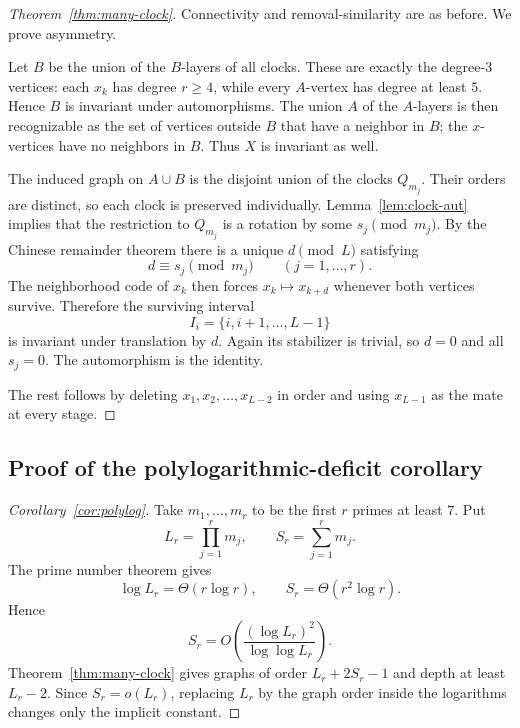 \documentclass[11pt]{article}
\theoremstyle{definition}
\theoremstyle{remark}
\begin{document}
\begin{proof}[Theorem~\ref{thm:many-clock}]
Connectivity and removal-similarity are as before. We prove asymmetry.

Let $B$ be the union of the $B$-layers of all clocks. These are exactly the degree-$3$ vertices: each $x_k$ has degree $r\ge4$, while every $A$-vertex has degree at least $5$. Hence $B$ is invariant under automorphisms. The union $A$ of the $A$-layers is then recognizable as the set of vertices outside $B$ that have a neighbor in $B$; the $x$-vertices have no neighbors in $B$. Thus $X$ is invariant as well.

The induced graph on $A\cup B$ is the disjoint union of the clocks $Q_{m_j}$. Their orders are distinct, so each clock is preserved individually. Lemma~\ref{lem:clock-aut} implies that the restriction to $Q_{m_j}$ is a rotation by some $s_j\pmod{m_j}$. By the Chinese remainder theorem there is a unique $d\pmod L$ satisfying
\[
    d\equiv s_j\pmod{m_j}
    \qquad (j=1,\ldots,r).
\]
The neighborhood code of $x_k$ then forces $x_k\mapsto x_{k+d}$ whenever both vertices survive. Therefore the surviving interval
\[
    I_i=\{i,i+1,\ldots,L-1\}
\]
is invariant under translation by $d$. Again its stabilizer is trivial, so $d=0$ and all $s_j=0$. The automorphism is the identity.

The rest follows by deleting $x_1,x_2,\ldots,x_{L-2}$ in order and using $x_{L-1}$ as the mate at every stage.
\end{proof}

\subsection{Proof of the polylogarithmic-deficit corollary}\label{app:polylog}

\begin{proof}[Corollary~\ref{cor:polylog}]
Take $m_1,\ldots,m_r$ to be the first $r$ primes at least $7$. Put
\[
    L_r=\prod_{j=1}^r m_j,
    \qquad
    S_r=\sum_{j=1}^r m_j.
\]
The prime number theorem gives
\[
    \log L_r=\Theta(r\log r),
    \qquad
    S_r=\Theta(r^2\log r).
\]
Hence
\[
    S_r=O\!\left(\frac{(\log L_r)^2}{\log\log L_r}\right).
\]
Theorem~\ref{thm:many-clock} gives graphs of order $L_r+2S_r-1$ and depth at least $L_r-2$. Since $S_r=o(L_r)$, replacing $L_r$ by the graph order inside the logarithms changes only the implicit constant.
\end{proof}
\end{document}
